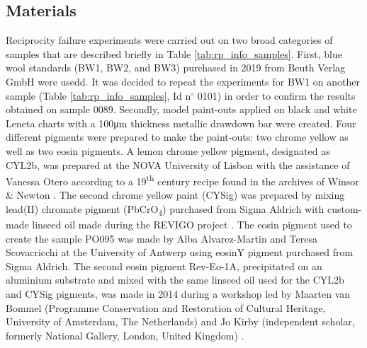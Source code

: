  
\subsection{Materials}

Reciprocity failure experiments were carried out on two broad categories of samples that are described briefly in Table \ref{tab:rp_info_samples}. First, blue wool standards (BW1, BW2, and BW3) purchased in 2019 from Beuth Verlag GmbH were usedd. It was decided to repeat the experiments for BW1 on another sample (Table \ref{tab:rp_info_samples}, Id n$^\circ$ 0101) in order to confirm the results obtained on sample 0089. Secondly, model paint-outs applied on black and white Leneta charts\textsuperscript{\textregistered} with a 100\unit{\um} thickness metallic drawdown bar were created. Four different pigments were prepared to make the paint-outs: two chrome yellow as well as two eosin pigments. A lemon chrome yellow pigment, designated as \gls{CYL2b}, was prepared at the NOVA University of Lisbon with the assistance of Vanessa Otero according to a 19\textsuperscript{th} century recipe found in the archives of Winsor \& Newton \citep{otero_historically_2018, otero_nineteenth_2017}. The second chrome yellow paint (\acrshort{CYSig}) was prepared by mixing lead(II) chromate pigment (PbCrO\textsubscript{4}) purchased from Sigma Aldrich with custom-made linseed oil made during the \gls{REVIGO} project \citep[3-6]{geldof_reconstructing_2018}. The eosin pigment used to create the sample PO095 was made by Alba Alvarez-Martin and Teresa Scovacricchi at the University of Antwerp using eosinY pigment purchased from Sigma Aldrich. The second eosin pigment \acrshort{Rev-Eo-1A}, precipitated on an aluminium substrate and mixed with the same linseed oil used for the \gls{CYL2b} and \gls{CYSig} pigments, was made in 2014 during a workshop led by Maarten van Bommel (Programme Conservation and Restoration of Cultural Heritage, University of Amsterdam, The Netherlands) and Jo Kirby (independent scholar, formerly National Gallery, London, United Kingdom) \citep[7]{geldof_reconstructing_2018}.


